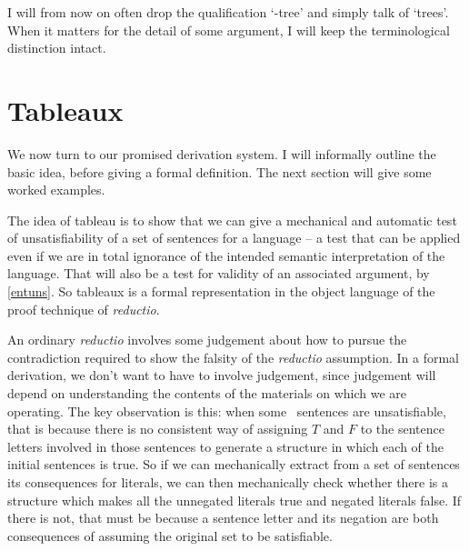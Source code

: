 I will from now on often  drop the qualification `\lone-tree' and simply talk of `trees'. When it matters for the detail of some argument, I will keep the terminological distinction intact. 

\section{Tableaux}

We now turn to our promised derivation system. I will informally outline the basic idea, before giving a formal definition. The next section will give some worked examples.

The idea of tableau is to show that we can give a mechanical and automatic test of unsatisfiability of a set of sentences for a language – a test that can be applied even if we are in total ignorance of the intended semantic interpretation of the language. That will also be a test for validity of an associated argument, by \autoref{entuns}. So tableaux is a formal representation in the object language of the proof technique of \emph{reductio}. 

An ordinary \emph{reductio} involves some judgement about how to pursue the contradiction required to show the falsity of the \emph{reductio} assumption. In a formal derivation, we don't want to have to involve judgement, since judgement will depend on understanding the contents of the materials on which we are operating. The key observation is this: when some \lone\ sentences are unsatisfiable, that is because there is no consistent way of assigning $T$ and $F$ to the sentence letters involved in those sentences to generate a structure in which each of the initial sentences is true. So if we can mechanically extract from a set of sentences its consequences for literals, we can then mechanically check whether there is a structure which makes all the unnegated literals true and negated literals false. If there is not, that must be because a sentence letter and its negation are both consequences of assuming the original set to be satisfiable.

